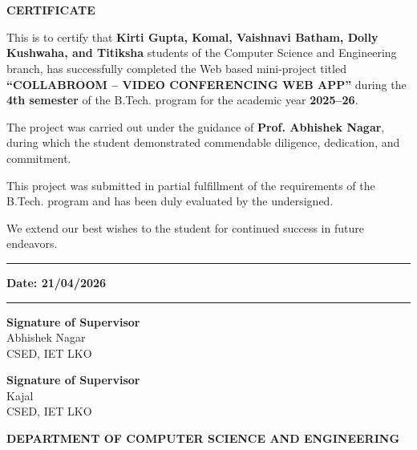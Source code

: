 \chapter*{}

\begin{center}
    \textbf{\Large CERTIFICATE}
\end{center}

\vspace{0.4cm}

This is to certify that \textbf{Kirti Gupta, Komal, Vaishnavi Batham, Dolly Kushwaha, and Titiksha} students of the Computer Science and Engineering branch, has successfully completed the Web based mini-project titled \textbf{“COLLABROOM – VIDEO CONFERENCING WEB APP”} during the \textbf{4th semester} of the B.Tech. program for the academic year \textbf{2025--26}.

\vspace{0.4cm}

The project was carried out under the guidance of \textbf{Prof. Abhishek Nagar}, during which the student demonstrated commendable diligence, dedication, and commitment.

\vspace{0.4cm}

This project was submitted in partial fulfillment of the requirements of the B.Tech. program and has been duly evaluated by the undersigned.

\vspace{0.4cm}

We extend our best wishes to the student for continued success in future endeavors.

\vspace{0.4cm}

\noindent\rule{\textwidth}{0.4pt}

\vspace{0.1cm}

\textbf{Date: 21/04/2026}

\vspace{0.1cm}

\noindent\rule{\textwidth}{0.4pt}

\vspace{1cm}

\begin{flushleft}
\textbf{Signature of Supervisor} \\
Abhishek Nagar \\
CSED, IET LKO
\end{flushleft}

\vspace{1cm}

\begin{flushleft}
\textbf{Signature of Supervisor} \\
Kajal \\
CSED, IET LKO
\end{flushleft}

\vspace{0.5cm}

\begin{center}
\textbf{DEPARTMENT OF COMPUTER SCIENCE AND ENGINEERING}
\end{center}

\newpage